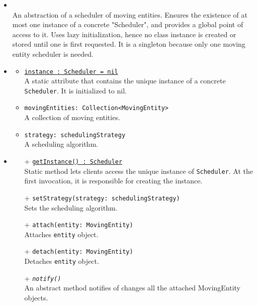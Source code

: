 \begin{itemize}
  \item \textbf{\descr} \\
  An abstraction of a scheduler of moving entities.
  Ensures the existence of at most one instance of a concrete "Scheduler", 
  and provides a global point of access to it.
  Uses lazy initialization, hence no class instance is created 
  or stored until one is first requested.
  It is a singleton because only one moving entity scheduler is needed.
  \item \textbf{\attrs}
  \begin{itemize}
    \item \texttt{\underline{instance : Scheduler = nil}} \\
    A static attribute that contains the unique instance 
    of a concrete \texttt{Scheduler}. It is initialized to nil.
    \item \texttt{movingEntities: Collection<MovingEntity>} \\
	A collection of moving entities.
	\item \texttt{strategy: schedulingStrategy} \\
	A scheduling algorithm.
  \end{itemize}
  \item \textbf{\ops}
  \begin{itemize}
    \item[+] \texttt{\underline{getInstance() : Scheduler}} \\
    Static method lets clients access the unique instance 
    of \texttt{Scheduler}. At the first invocation, it is responsible 
    for creating the instance.
    \item[+] \texttt{setStrategy(strategy: schedulingStrategy)} \\
    Sets the scheduling algorithm.
    \item[+] \texttt{attach(entity: MovingEntity)} \\
    Attaches \texttt{entity} object.
	\item[+] \texttt{detach(entity: MovingEntity)} \\
	Detaches \texttt{entity} object.
	\item[+] \texttt{\textit{notify()}} \\
	An abstract method notifies of changes all the attached MovingEntity objects.
  \end{itemize}
\end{itemize}
